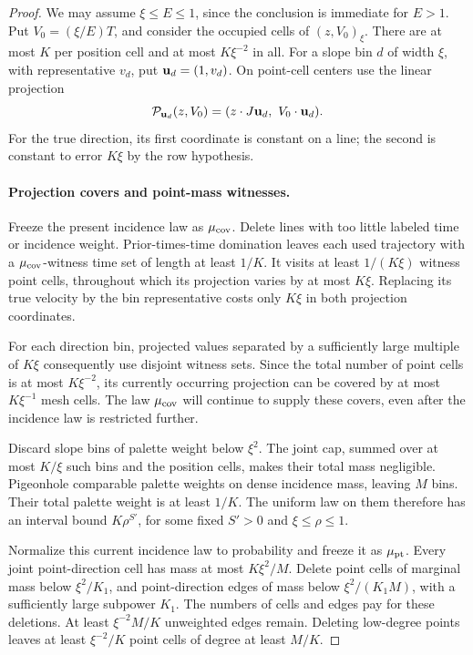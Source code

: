 \begin{proof}
We may assume \(\xi\le E\le1\), since the conclusion is
immediate for \(E>1\).  Put \(V_0=(\xi/E)T\), and consider
the occupied cells of \((z,V_0)_\xi\).  There are at most
\(K\) per position cell and at most \(K\xi^{-2}\) in all.
For a slope bin \(d\) of width \(\xi\), with representative
\(v_d\), put \({\bf u}_d=(1,v_d)\).  On point-cell centers
use the linear projection
\[
 \mathcal P_{{\bf u}_d}(z,V_0)
    =(z\cdot J{\bf u}_d,\ V_0\cdot{\bf u}_d).
\]
For the true direction, its first coordinate is constant on a line;
the second is constant to error \(K\xi\) by the row hypothesis.

\paragraph{Projection covers and point-mass witnesses.}
Freeze the present incidence law as \(\mu_{\rm cov}\).
Delete lines with too little labeled time or incidence weight.
Prior-times-time domination leaves each used trajectory with a
\(\mu_{\rm cov}\)-witness time set of length at least \(1/K\).
It visits at least \(1/(K\xi)\) witness point cells, throughout
which its projection varies by at most \(K\xi\).  Replacing its
true velocity by the bin representative costs only \(K\xi\)
in both projection coordinates.

For each direction bin, projected values separated by a sufficiently
large multiple of \(K\xi\) consequently use disjoint witness
sets.  Since the total number of point cells is at most
\(K\xi^{-2}\), its currently occurring projection can be
covered by at most \(K\xi^{-1}\) mesh cells.  The law
\(\mu_{\rm cov}\) will continue to supply these covers, even
after the incidence law is restricted further.

Discard slope bins of palette weight below \(\xi^2\).
The joint cap, summed over at most \(K/\xi\) such bins and
the position cells, makes their total mass negligible.
Pigeonhole comparable palette weights on dense incidence mass,
leaving \(M\) bins.  Their total palette weight is at least
\(1/K\).  The uniform law on them therefore has an interval
bound \(K\rho^{S'}\), for some fixed \(S'>0\) and
\(\xi\le\rho\le1\).

Normalize this current incidence law to probability and freeze it
as \(\mu_{\rm pt}\).  Every joint point-direction cell has
mass at most \(K\xi^2/M\).  Delete point cells of marginal
mass below \(\xi^2/K_1\), and point-direction edges of mass
below \(\xi^2/(K_1M)\), with a sufficiently large subpower
\(K_1\).  The numbers of cells and edges pay for these
deletions.  At least \(\xi^{-2}M/K\) unweighted edges remain.
Deleting low-degree points leaves at least \(\xi^{-2}/K\)
point cells of degree at least \(M/K\).


\end{proof}
